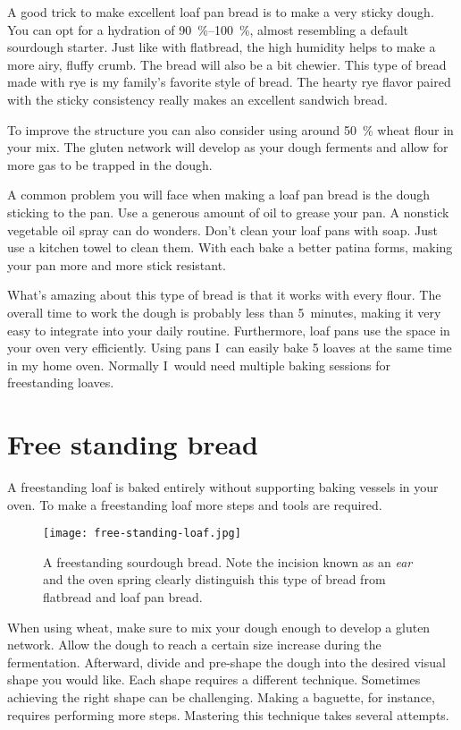 A good trick to make excellent loaf pan bread is to make a very
sticky dough. You can opt for a hydration of \qtyrange{90}{100}{\percent}, almost
resembling a default sourdough starter. Just like with flatbread,
the high humidity helps to make a more airy, fluffy crumb. The bread will
also be a bit chewier. This type of bread made with rye is my family's favorite
style of bread.  The hearty rye flavor paired with the sticky consistency really
makes an excellent sandwich bread.

To improve the structure you can also consider using around \qty{50}{\percent}
wheat flour in your mix. The gluten network will develop as your
dough ferments and allow for more gas to be trapped in the dough.

A common problem you will face when making a loaf pan bread is
the dough sticking to the pan. Use a generous amount of oil to grease
your pan. A nonstick vegetable oil spray can do wonders.
Don't clean your loaf pans with soap. Just use a kitchen towel
to clean them. With each bake a better patina forms, making your
pan more and more stick resistant.

What's amazing about this type of bread is that it works
with every flour. The overall time to work the dough is probably
less than 5~minutes, making it very easy to integrate
into your daily routine. Furthermore, loaf pans use the space
in your oven very efficiently. Using pans I~can
easily bake 5 loaves at the same time in my home oven.
Normally I~would need multiple baking sessions for
freestanding loaves.

\section{Free standing bread}

A freestanding loaf is baked entirely without supporting
baking vessels in your oven. To make a freestanding loaf more steps
and tools are required.

\begin{figure}[!htb]
\begin{center}
  \texttt{[image: free-standing-loaf.jpg]}
  \caption[Freestanding sourdough bread]{A freestanding sourdough bread. Note
      the incision known as an \emph{ear} and the oven spring clearly
      distinguish this type of bread from flatbread and loaf pan bread.}
\end{center}
\end{figure}

When using wheat, make sure to mix your dough enough to develop a gluten network.
Allow the dough to reach a certain size increase during the fermentation.
Afterward, divide and pre-shape the dough into the desired visual shape you
would like. Each shape requires a different technique. Sometimes achieving
the right shape can be challenging. Making a baguette, for instance,
requires performing more steps. Mastering this technique takes several attempts.

